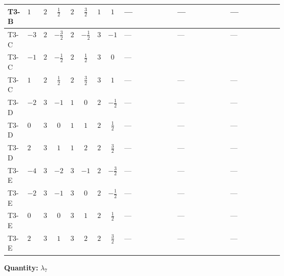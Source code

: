 \documentclass[8pt]{article}
\begin{document}
\begin{landscape}
\begin{longtable}{@{}llcccccc >{\raggedright\arraybackslash}p{0.21\linewidth} >{\raggedright\arraybackslash}p{0.21\linewidth} >{\raggedright\arraybackslash}p{0.21\linewidth}@{}}
\midrule
T3-B & $1$ & $2$ & $\frac{1}{2}$ & $2$ & $\frac{3}{2}$ & $1$ & $1$ & --- & --- & --- \\
\midrule
T3-C & $-3$ & $2$ & $-\frac{3}{2}$ & $2$ & $-\frac{1}{2}$ & $3$ & $-1$ & --- & --- & --- \\
\midrule
T3-C & $-1$ & $2$ & $-\frac{1}{2}$ & $2$ & $\frac{1}{2}$ & $3$ & $0$ & --- & \scriptsize\adjustbox{max width=\linewidth}{$\begin{gathered} -\frac{1}{2} \left({\lambda_5}\right)^{*} \operatorname{Tr}\!\left({y_2}\,\left({y_1}\right)^{\dagger}\right)\end{gathered}$} & \scriptsize\adjustbox{max width=\linewidth}{$\begin{gathered} -9 {g_2}^2 {\lambda_{7}}\end{gathered}$} \\
\midrule
T3-C & $1$ & $2$ & $\frac{1}{2}$ & $2$ & $\frac{3}{2}$ & $3$ & $1$ & --- & --- & --- \\
\midrule
T3-D & $-2$ & $3$ & $-1$ & $1$ & $0$ & $2$ & $-\frac{1}{2}$ & --- & --- & --- \\
\midrule
T3-D & $0$ & $3$ & $0$ & $1$ & $1$ & $2$ & $\frac{1}{2}$ & --- & --- & --- \\
\midrule
T3-D & $2$ & $3$ & $1$ & $1$ & $2$ & $2$ & $\frac{3}{2}$ & --- & --- & --- \\
\midrule
T3-E & $-4$ & $3$ & $-2$ & $3$ & $-1$ & $2$ & $-\frac{3}{2}$ & --- & --- & --- \\
\midrule
T3-E & $-2$ & $3$ & $-1$ & $3$ & $0$ & $2$ & $-\frac{1}{2}$ & --- & --- & --- \\
\midrule
T3-E & $0$ & $3$ & $0$ & $3$ & $1$ & $2$ & $\frac{1}{2}$ & --- & --- & --- \\
\midrule
T3-E & $2$ & $3$ & $1$ & $3$ & $2$ & $2$ & $\frac{3}{2}$ & --- & --- & --- \\
\midrule
\bottomrule
\end{longtable}
\clearpage
\noindent\textbf{Quantity: }$\lambda_{7}$\par\smallskip

\end{landscape}
\end{document}
